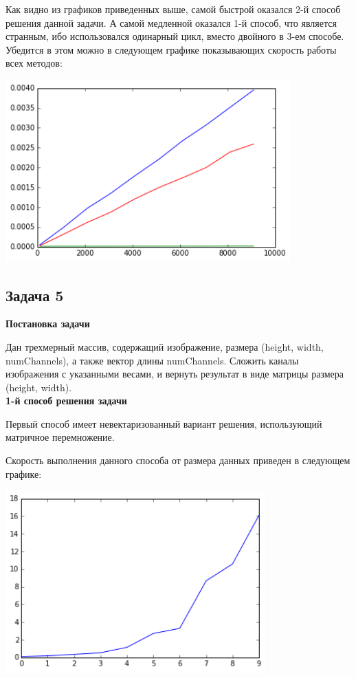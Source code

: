 \documentclass[12pt, a4paper]{article}
\begin{document}
				Как видно из графиков приведенных выше, самой быстрой оказался 2-й способ решения данной задачи. А самой медленной оказался 1-й способ, что является странным, ибо использовался одинарный цикл, вместо двойного в 3-ем способе. Убедится в этом можно в следующем графике показывающих скорость работы всех методов:
				\begin{center}
					\includegraphics[height=7cm]{timeit/num4_ti123.png}
				\end{center}



		\newpage
		\subsection{Задача 5}

			{\bf Постановка задачи\\}

				Дан трехмерный массив, содержащий изображение, размера (height, width, numChannels), а также вектор длины numChannels. Сложить каналы изображения с указанными весами, и вернуть результат в виде матрицы размера (height, width). \\

			{\bf 1-й способ решения задачи\\}

				Первый способ имеет невектаризованный вариант решения, использующий матричное перемножение.

				Скорость выполнения данного способа от размера данных приведен в следующем графике:
				\begin{center}
					\includegraphics[height=7cm]{timeit/num5_ti1.png}
				\end{center}
\end{document}

